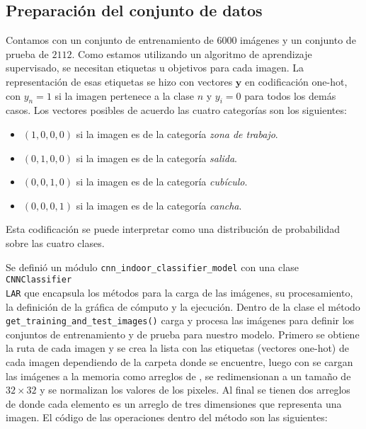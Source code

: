 \subsection{Preparación del conjunto de datos}

Contamos con un conjunto de entrenamiento de $6000$ imágenes y 
un conjunto de prueba de $2112$.
Como estamos utilizando un algoritmo de aprendizaje supervisado, 
se necesitan etiquetas u objetivos para cada imagen. La representación
de esas etiquetas se hizo con vectores $\mathbf{y}$ en codificación one-hot,
con $y_n = 1$ si la imagen pertenece a la clase $n$ y $y_i = 0$ para todos los
demás casos. Los vectores posibles de acuerdo las cuatro categorías son los siguientes:

\begin{itemize}
\item $(1, 0, 0, 0)$ si la imagen es de la categoría \textit{zona de trabajo}.
\item $(0, 1, 0, 0)$ si la imagen es de la categoría \textit{salida}.
\item $(0, 0, 1, 0)$ si la imagen es de la categoría \textit{cubículo}.
\item $(0, 0, 0, 1)$ si la imagen es de la categoría \textit{cancha}.
\end{itemize}

Esta codificación se puede interpretar como una distribución de probabilidad
sobre las cuatro clases.

Se definió un módulo \texttt{cnn\_indoor\_classifier\_model} con 
una clase \texttt{CNNClassifier\\LAR}
que encapsula los métodos para la carga de las imágenes, su 
procesamiento, la definición de la gráfica de cómputo y la ejecución.
Dentro de la clase el método \texttt{get\_training\_and\_test\_images()}
carga y procesa las imágenes para definir los conjuntos de entrenamiento
y de prueba para nuestro modelo.
Primero se obtiene la ruta de cada imagen y se crea la lista con las etiquetas
(vectores one-hot)
de cada imagen dependiendo de la carpeta donde se encuentre, luego con
 se cargan las imágenes a la memoria como arreglos de
, se redimensionan a un tamaño de $32 \times 32$ y se normalizan
los valores de los pixeles. Al final se tienen dos arreglos de 
donde cada elemento es un arreglo de tres dimensiones que
representa una imagen. El código de las operaciones dentro del método
son las siguientes:

